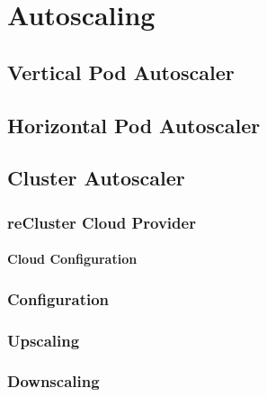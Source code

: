 \chapter{Autoscaling}
\label{cha:autoscaling}

\section{Vertical Pod Autoscaler}
\label{sec:autoscaling_vertical_pod_autoscaler}

\section{Horizontal Pod Autoscaler}
\label{sec:autoscaling_horizontal_pod_autoscaler}

\section{Cluster Autoscaler}
\label{sec:autoscaling_cluster_autoscaler}

\subsection{reCluster Cloud Provider}
\label{subsec:autoscaling_cluster_autoscaler_recluster_cloud_provider}

\subsubsection{Cloud Configuration}
\label{subsubsec:autoscaling_cluster_autoscaler_recluster_cloud_provider_cloud_configuration}

\subsection{Configuration}
\label{subsec:autoscaling_cluster_autoscaler_configuration}

\subsection{Upscaling}
\label{subsec:autoscaling_cluster_autoscaler_upscaling}

\subsection{Downscaling}
\label{subsec:autoscaling_cluster_autoscaler_downscaling}